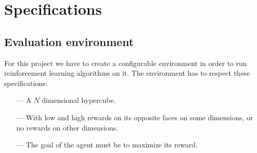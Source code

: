 \documentclass{article}
\begin{document}
\section{Specifications}

\subsection{Evaluation environment}

For this project we have to create a configurable environment in order to run reinforcement learning algorithms on it. The environment has to respect these specifications:
\begin{itemize}
    \item[---] A $N$ dimensional hypercube.
    \item[---] With low and high rewards on its opposite faces on some dimensions, or no rewards on other dimensions.
    \item[---] The goal of the agent must be to maximize its reward.
\end{itemize}
\end{document}
